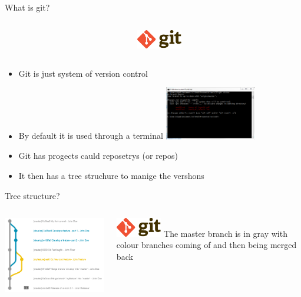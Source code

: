 \documentclass[10pt]{beamer}
\begin{document}
\begin{frame}[fragile]{What is git?}
  \begin{columns}[T]
    \begin{column}{.8\textwidth}
    \end{column}
    \begin{column}{.2\textwidth}
	\includegraphics[width=2cm]{Figs/Git-logo}
    \end{column}
  \end{columns}
	\begin{itemize}
		\item Git is just system of version control
		\item By default it is used through a terminal
		\includegraphics[width=4cm]{Figs/git/status}
		\item Git has progects cauld reposetrys (or repos)
		\item It then has a tree struchure to manige the vershons
	\end{itemize}
\end{frame}


\begin{frame}[fragile]{Tree structure?}
  \begin{columns}[T]
    \begin{column}{.8\textwidth}
	\includegraphics[width=9cm]{Figs/git/tree}
    \end{column}
    \begin{column}{.2\textwidth}
	\includegraphics[width=2cm]{Figs/Git-logo} \newline  \newline
	The master branch is in gray with colour branches coming of and then being merged back
    \end{column}
  \end{columns}
\end{frame}
\end{document}
